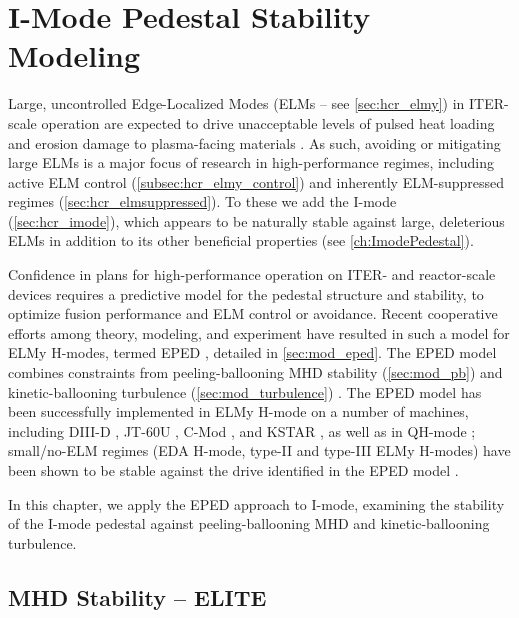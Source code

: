 \chapter{I-Mode Pedestal Stability Modeling}\label{ch:ImodeModeling}

Large, uncontrolled Edge-Localized Modes (ELMs -- see \cref{sec:hcr_elmy}) in ITER-scale operation are expected to drive unacceptable levels of pulsed heat loading and erosion damage to plasma-facing materials \cite{Loarte2003,Federici2003}.  As such, avoiding or mitigating large ELMs is a major focus of research in high-performance regimes, including active ELM control (\cref{subsec:hcr_elmy_control}) and inherently ELM-suppressed regimes (\cref{sec:hcr_elmsuppressed}).  To these we add the I-mode (\cref{sec:hcr_imode}), which appears to be naturally stable against large, deleterious ELMs in addition to its other beneficial properties (see \cref{ch:ImodePedestal}).

Confidence in plans for high-performance operation on ITER- and reactor-scale devices requires a predictive model for the pedestal structure and stability, to optimize fusion performance and ELM control or avoidance.  Recent cooperative efforts among theory, modeling, and experiment \cite{Groebner2013} have resulted in such a model for ELMy H-modes, termed EPED \cite{Snyder2009,Snyder2011}, detailed in \cref{sec:mod_eped}.  The EPED model combines constraints from peeling-ballooning MHD stability (\cref{sec:mod_pb}) \cite{Wilson2002,Snyder2004,Wilson2006} and kinetic-ballooning turbulence (\cref{sec:mod_turbulence}) \cite{Snyder1999,Candy2005,Snyder2001}.  The EPED model has been successfully implemented in ELMy H-mode on a number of machines, including DIII-D \cite{Snyder2009,Snyder2011}, JT-60U \cite{Snyder2009}, C-Mod \cite{Walk2012}, and KSTAR \cite{Han2013}, as well as in QH-mode \cite{Snyder2012}; small/no-ELM regimes (EDA H-mode, type-II and type-III ELMy H-modes) have been shown to be stable against the drive identified in the EPED model \cite{Snyder2009}.

In this chapter, we apply the EPED approach to I-mode, examining the stability of the I-mode pedestal against peeling-ballooning MHD and kinetic-ballooning turbulence.

\section{MHD Stability -- ELITE}\label{sec:imode_elite}

